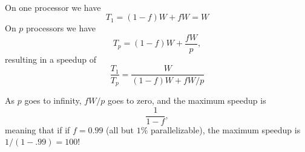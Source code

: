 \paragraph{}
On one processor we have 
\[
T_1 = (1-f)W + fW = W
\]
On $p$ processors we have
\[
T_p = (1-f)W + \frac{fW}{p},
\]
resulting in a speedup of 
\[
\frac{T_1}{T_p} = \frac{W}{(1-f)W+fW/p}
\]

As $p$ goes to infinity, $fW/p$ goes to zero, and the maximum speedup is
\[
\frac{1}{1-f},
\]
meaning that if 
if $f = 0.99$ (all but $1\%$ parallelizable), the maximum speedup
is $1/(1-.99)=100$!
